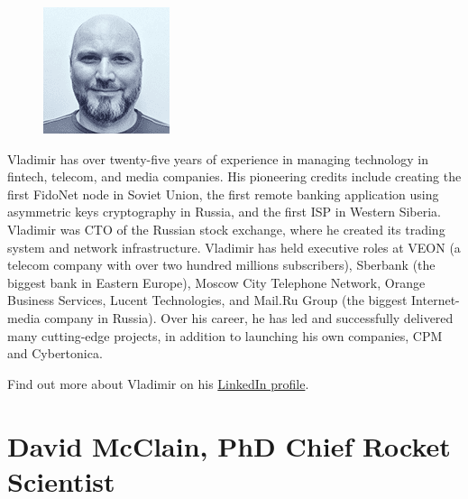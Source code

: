 \documentclass[8pt,fleqn,openany]{book}
\begin{document}
	{
		\setlength\intextsep{0pt}
		\begin{figure}
			\includegraphics{images/team/team-2.png}
		\end{figure}
		
		Vladimir has over twenty-five years of experience in managing technology in fintech, telecom, and media companies. His pioneering credits include creating the first FidoNet node in Soviet Union, the first remote banking application using asymmetric keys cryptography in Russia, and the first ISP in Western Siberia. Vladimir was CTO of the Russian stock exchange, where he created its trading system and network infrastructure. Vladimir has held executive roles at VEON (a telecom company with over two hundred millions subscribers), Sberbank (the biggest bank in Eastern Europe), Moscow City Telephone Network, Orange Business Services, Lucent Technologies, and Mail.Ru Group (the biggest Internet-media company in Russia). Over his career, he has led and successfully delivered many cutting-edge projects, in addition to launching his own companies, CPM and Cybertonica. 
		
		Find out more about Vladimir on his \href{https://linkedin.com/in/vlebedev}{LinkedIn profile}.
	}
	
	\section{David McClain, PhD Chief Rocket Scientist}
	
\end{document}
